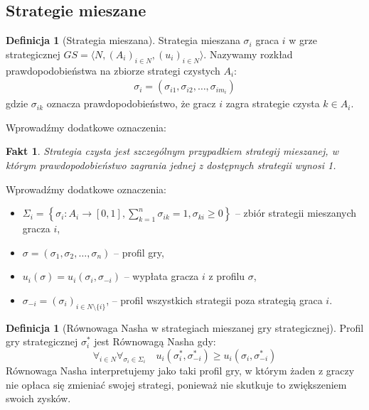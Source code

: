 \documentclass[inzynierska]{pwr_wmat_praca_dyplomowa}
\theoremstyle{plain}
\numberwithin{theorem}{chapter}
\newtheorem{fact}[theorem]{Fakt}
\theoremstyle{definition}
\numberwithin{theorem}{chapter}
\newtheorem{definition}[theorem]{Definicja}
\begin{document}
	\subsection{Strategie mieszane}
	\begin{definition}[Strategia mieszana]
		Strategia mieszana $\sigma_i$ graca $i$ w grze strategicznej $GS = \langle N, (A_i)_{i \in N},(u_i)_{i \in N} \rangle $. Nazywamy rozkład prawdopodobieństwa na zbiorze strategi czystych $A_i$:
		\begin{align*}
			\sigma_i = (\sigma_{i1}, \sigma_{i2},\dots,\sigma_{im_i})
		\end{align*}
	gdzie $\sigma_{ik}$ oznacza prawdopodobieństwo, że gracz $i$ zagra strategie czysta $k\in A_i$.  
	\end{definition}
	Wprowadźmy dodatkowe oznaczenia:
	\begin{fact}
		Strategia czysta jest szczególnym przypadkiem strategij mieszanej, w którym prawdopodobieństwo zagrania jednej z dostępnych strategii wynosi 1.
	\end{fact}
	Wprowadźmy dodatkowe oznaczenia:
 	\begin{itemize}
 		\item $\Sigma_i  = \left\{ \sigma_i: A_i \rightarrow [0,1],\displaystyle\sum_{k=1}^{n} \sigma_{ik} = 1, \sigma_{ki}\ge 0 \right\}$ -- zbiór strategii mieszanych gracza $i$,
 		\item  $\sigma = (\sigma_1, \sigma_2,\dots,\sigma_n)$ -- profil gry,
 		\item $u_i(\sigma) = u_i(\sigma_i,\sigma_{-i})$ -- wypłata gracza $i$ z profilu $\sigma$,
 		\item $\sigma_{-i} = (\sigma_i)_{i\in N \setminus \{i\}}$, -- profil wszystkich strategii poza strategią graca $i$. 
 	\end{itemize}
	\begin{definition}[Równowaga Nasha w strategiach mieszanej gry strategicznej]
		Profil gry strategicznej $\sigma_i^*$ jest Równowagą Nasha gdy:
		\begin{equation*}
			\displaystyle\mathop{\forall}_{i \in N} 
			\displaystyle\mathop{\forall}_{\sigma_i \in \Sigma_i} \quad
			u_i(\sigma_i^*,\sigma_{-i}^*) \ge u_i(\sigma_i, \sigma_{-i}^*)
		\end{equation*}
	Równowaga Nasha interpretujemy jako taki profil gry, w którym żaden z graczy nie opłaca się zmieniać swojej strategi, ponieważ nie skutkuje to zwiększeniem swoich zysków.
	\end{definition}
\end{document}
